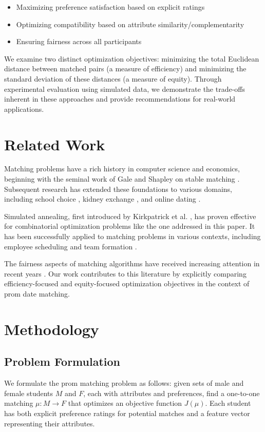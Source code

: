 \documentclass[10pt,journal,compsoc]{IEEEtran}
\begin{document}
\begin{itemize}
\item Maximizing preference satisfaction based on explicit ratings
\item Optimizing compatibility based on attribute similarity/complementarity
\item Ensuring fairness across all participants
\end{itemize}

We examine two distinct optimization objectives: minimizing the total Euclidean distance between matched pairs (a measure of efficiency) and minimizing the standard deviation of these distances (a measure of equity). Through experimental evaluation using simulated data, we demonstrate the trade-offs inherent in these approaches and provide recommendations for real-world applications.

\section{Related Work}
Matching problems have a rich history in computer science and economics, beginning with the seminal work of Gale and Shapley on stable matching \cite{gale1962college}. Subsequent research has extended these foundations to various domains, including school choice \cite{abdulkadiroglu2003school}, kidney exchange \cite{roth2004kidney}, and online dating \cite{hitsch2010matching}.

Simulated annealing, first introduced by Kirkpatrick et al. \cite{kirkpatrick1983optimization}, has proven effective for combinatorial optimization problems like the one addressed in this paper. It has been successfully applied to matching problems in various contexts, including employee scheduling \cite{thompson1996shift} and team formation \cite{ahmadi2018simulated}.

The fairness aspects of matching algorithms have received increasing attention in recent years \cite{abdulkadiroglu2003school, baiou2000student}. Our work contributes to this literature by explicitly comparing efficiency-focused and equity-focused optimization objectives in the context of prom date matching.

\section{Methodology}

\subsection{Problem Formulation}
We formulate the prom matching problem as follows: given sets of male and female students $M$ and $F$, each with attributes and preferences, find a one-to-one matching $\mu: M \rightarrow F$ that optimizes an objective function $J(\mu)$. Each student has both explicit preference ratings for potential matches and a feature vector representing their attributes.
\end{document}

